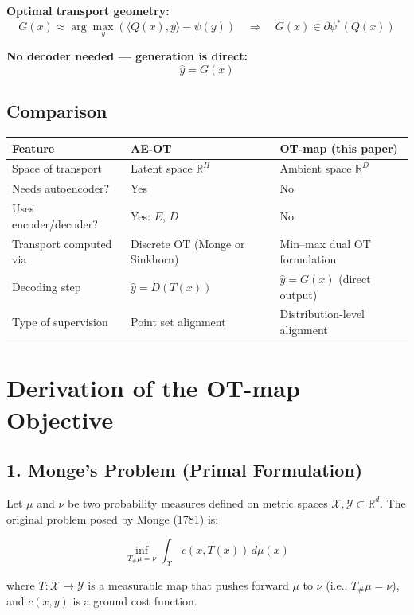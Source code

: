 \documentclass[11pt]{article}
\begin{document}
\textbf{Optimal transport geometry:}
\[
G(x) \approx \arg\max_y \left( \langle Q(x), y \rangle - \psi(y) \right)
\quad \Rightarrow \quad G(x) \in \partial \psi^*(Q(x))
\]

\textbf{No decoder needed — generation is direct:}
\[
\hat{y} = G(x)
\]

\subsection*{Comparison}

\begin{center}
\begin{tabular}{|l|l|l|}
\hline
\textbf{Feature} & \textbf{AE-OT} & \textbf{OT-map (this paper)} \\
\hline
Space of transport & Latent space $\mathbb{R}^H$ & Ambient space $\mathbb{R}^D$ \\
Needs autoencoder? & Yes & No \\
Uses encoder/decoder? & Yes: $E$, $D$ & No \\
Transport computed via & Discrete OT (Monge or Sinkhorn) & Min--max dual OT formulation \\
Decoding step & $\hat{y} = D(T(x))$ & $\hat{y} = G(x)$ (direct output) \\
Type of supervision & Point set alignment & Distribution-level alignment \\
\hline
\end{tabular}
\end{center}


\section*{Derivation of the OT-map Objective}

\subsection*{1. Monge’s Problem (Primal Formulation)}

Let \(\mu\) and \(\nu\) be two probability measures defined on metric spaces \(\mathcal{X}, \mathcal{Y} \subset \mathbb{R}^d\). The original problem posed by Monge (1781) is:

\[
\inf_{T_\#\mu = \nu} \int_{\mathcal{X}} c(x, T(x)) \, d\mu(x)
\]

where \(T : \mathcal{X} \rightarrow \mathcal{Y}\) is a measurable map that pushes forward \(\mu\) to \(\nu\) (i.e., \(T_\#\mu = \nu\)), and \(c(x, y)\) is a ground cost function.
\end{document}
